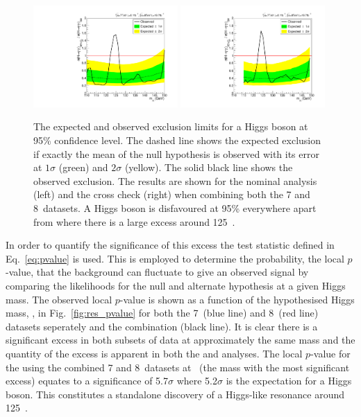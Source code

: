 \begin{figure}
  \includegraphics[width=0.49\textwidth]{results/plots/mva_limit.pdf}
  \includegraphics[width=0.49\textwidth]{results/plots/sideband_limit.pdf}
  \caption[The expected and observed exclusion limits for a \acs{SM} Higgs boson at 95\& confidence level]{The expected and observed exclusion limits for a \SM Higgs boson at 95\% confidence level. The dashed line shows the expected exclusion if exactly the mean of the null hypothesis is observed with its error at $1\sigma$ (green) and $2\sigma$ (yellow). The solid black line shows the observed exclusion. The results are shown for the nominal \MFM analysis (left) and the cross check \SMVA (right) when combining both the 7 and 8~\TeV datasets. A \SM Higgs boson is disfavoured at 95\% everywhere apart from where there is a large excess around 125~\GeV.}
  \label{fig:res_exclusion}
\end{figure}

In order to quantify the significance of this excess the test statistic defined in Eq.~\ref{eq:pvalue} is used. This is employed to determine the probability, the local $p$-value, that the background can fluctuate to give an observed signal by comparing the likelihoods for the null and alternate hypothesis at a given Higgs mass. The observed local $p$-value is shown as a function of the hypothesised Higgs mass, \mH, in Fig.~\ref{fig:res_pvalue} for both the 7~\TeV (blue line) and 8~\TeV (red line) datasets seperately and the combination (black line). It is clear there is a significant excess in both subsets of data at approximately the same mass and the quantity of the excess is apparent in both the \MFM and \SMVA analyses. The local $p$-value for the \MFM using the combined 7 and 8~\TeV datasets at ~\GeV (the mass with the most significant excess) equates to a significance of 5.7$\sigma$ where 5.2$\sigma$ is the expectation for a \SM Higgs boson. This constitutes a standalone discovery of a Higgs-like resonance around 125~\GeV.

